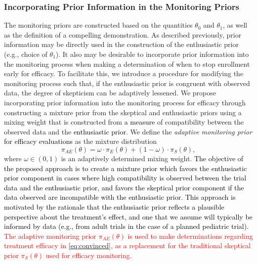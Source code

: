 \documentclass[12pt]{article}
\begin{document}
\subsubsection{Incorporating Prior Information in the Monitoring Priors}\label{sec:incorporating}
The monitoring priors are constructed based on the quantities $\theta_0$ and $\theta_1$, as well as the definition of a compelling demonstration. 
%
As described previously, prior information may be directly used in the construction of the enthusiastic prior (e.g., choice of $\theta_1$).
%
It also may be desirable to incorporate prior information into the monitoring process when making a determination of when to stop enrollment 
early for efficacy.
%
To facilitate this, we introduce a procedure for modifying the monitoring process such that, if the enthusiastic prior is congruent with observed data, the degree of skepticism can be adaptively lessened.
We propose incorporating prior information into the monitoring process for efficacy through constructing a mixture prior
from the skeptical and enthusiastic priors using a mixing weight that is constructed from \textcolor{black}{a measure} of compatibility between the
observed data and the \textcolor{black}{enthusiastic prior}. 
We define the \textit{adaptive monitoring prior} \textcolor{black}{for efficacy evaluations} as the mixture distribution	
\begin{equation}\label{eq:inference_prior}
	\pi_{AE}\left(\theta\right)=\omega\cdot\pi_E(\theta)+(1 - \omega)\cdot \pi_S(\theta),
\end{equation}
where $\omega\in(0,1)$ is an adaptively determined mixing weight. %
%
\textcolor{black}{The objective of the proposed approach is to create a mixture prior which favors the enthusiastic prior component in cases where high compatibility is observed between the trial data and the enthusiastic prior, and favors the skeptical prior component if the data observed are incompatible with the enthusiastic prior. This approach is motivated by the rationale that the enthusiastic prior reflects a plausible perspective about the treatment's effect, and one that we assume will typically be informed by data (e.g., from adult trials in the case of a planned pediatric trial).} \textcolor{red}{The adaptive monitoring prior $\pi_{AE}(\theta)$ is used to make determinations regarding treatment efficacy in \eqref{eq:convinced}, as a replacement for the traditional skeptical prior $\pi_S(\theta)$ used for efficacy monitoring.}
\end{document}
